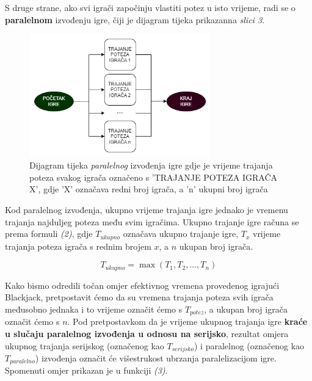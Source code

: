 \documentclass[conference]{IEEEtran}
\begin{document}
S druge strane, ako svi igrači započinju vlastiti potez u isto vrijeme, radi se o \textbf{paralelnom} izvođenju igre, čiji je dijagram tijeka prikazan\break na \textit{slici 3}.
\begin{figure}[H]
\centerline{\includegraphics[width=18.5pc]{paralelnog-bijelo.png}}
\caption{Dijagram tijeka \textit{paralelnog} izvođenja igre gdje je vrijeme trajanja poteza svakog igrača označeno s 'TRAJANJE POTEZA IGRAČA X', gdje 'X' označava redni broj igrača, a 'n' ukupni broj igrača}
\vspace*{-5pt}
\end{figure}

Kod paralelnog izvođenja, ukupno vrijeme trajanja igre jednako je vremenu trajanja najduljeg poteza među svim igračima. Ukupno trajanje igre računa se prema formuli \textit{(2)}, gdje $T_{ukupno}$ označava ukupno trajanje igre, $T_x$ vrijeme trajanja poteza igrača s rednim brojem $x$, a $n$ ukupan broj igrača.


\begin{equation}
T_{ukupno} = \max{(T_1, T_2, ... , T_n)}
\end{equation}

Kako bismo odredili točan omjer efektivnog vremena provedenog igrajući Blackjack, pretpostavit ćemo da su vremena trajanja poteza svih igrača međusobno jednaka i to vrijeme označit ćemo s $T_{potez}$, a ukupan broj igrača označit ćemo s $n$. Pod pretpostavkom da je vrijeme ukupnog trajanja igre \textbf{kraće u slučaju paralelnog izvođenja u odnosu na serijsko}, rezultat omjera ukupnog trajanja serijskog (označenog kao $T_{serijsko}$) i paralelnog (označenog kao $T_{paralelno}$) izvođenja označit će višestrukost ubrzanja paralelizacijom igre. Spomenuti omjer prikazan je u funkciji \textit{(3)}.
\end{document}
